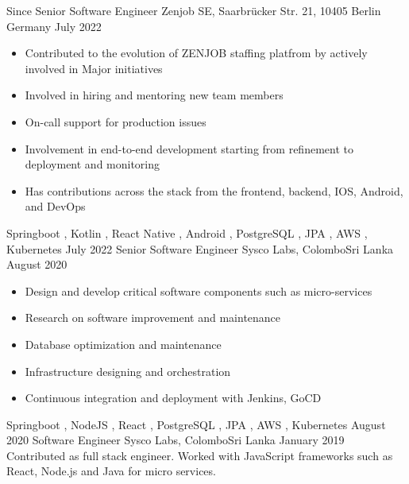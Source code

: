 

\begin{experiences}
  \experience
    {Since} {Senior Software Engineer}{ Zenjob SE, Saarbrücker Str. 21, 10405 Berlin }{Germany}
    {July 2022} {
                          \begin{itemize}
                           \item Contributed to the evolution of ZENJOB staffing platfrom by actively involved in Major initiatives
                           \item Involved in hiring and mentoring new team members
                           \item On-call support for production issues
                           \item Involvement in end-to-end development starting from refinement to deployment and monitoring
                           \item Has contributions across the stack from the frontend, backend, IOS, Android, and DevOps
                          \end{itemize}
                        }
                        {Springboot , Kotlin , React Native , Android , PostgreSQL , JPA , AWS , Kubernetes}
  \emptySeparator
  \experience
    {July 2022}   {Senior Software Engineer}{ Sysco Labs, Colombo}{Sri Lanka}
    {August 2020} {
                      \begin{itemize}
                       \item Design and develop critical software components such as micro-services
                       \item Research on software improvement and maintenance
                       \item Database optimization and maintenance
                       \item Infrastructure designing and orchestration
                        \item Continuous integration and deployment with Jenkins, GoCD 
                      \end{itemize}
                    }
                    {Springboot , NodeJS , React , PostgreSQL , JPA , AWS , Kubernetes}
  \emptySeparator
  \experience
    {August 2020} {Software Engineer}{ Sysco Labs, Colombo}{Sri Lanka}
    {January 2019} {
                   Contributed as full stack engineer. Worked with JavaScript frameworks
                    such as React, Node.js and Java for micro services.
}
\end{experiences}
